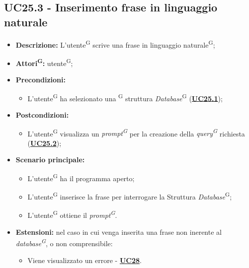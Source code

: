 \subsection{UC25.3 - Inserimento frase in linguaggio naturale}
\label{sec:UC25.3}
\begin{itemize}
	\item \textbf{Descrizione:} L’utente\textsuperscript{G} scrive una frase in linguaggio naturale\textsuperscript{G};
	\item \textbf{Attori\textsuperscript{G}:} utente\textsuperscript{G};
	\item \textbf{Precondizioni:} 
	\begin{itemize}
		\item L’utente\textsuperscript{G} ha selezionato una \textsuperscript{G} struttura \textit{Database}\textsuperscript{G} (\hyperref[sec:UC25.1]{\textbf{UC25.1}});
	\end{itemize}
	\item \textbf{Postcondizioni:} 
	\begin{itemize}
		\item L’utente\textsuperscript{G} visualizza un \textit{prompt\textsuperscript{G}} per la creazione della \textit{query\textsuperscript{G}} richiesta (\hyperref[sec:UC25.2]{\textbf{UC25.2}});
	\end{itemize}
	\item \textbf{Scenario principale:} 
	\begin{itemize}
		\item L’utente\textsuperscript{G} ha il programma aperto;
		\item L’utente\textsuperscript{G} inserisce la frase per interrogare la Struttura \textit{Database}\textsuperscript{G};
		\item L’utente\textsuperscript{G} ottiene il \textit{prompt\textsuperscript{G}}.
	\end{itemize}
	\item \textbf{Estensioni:} nel caso in cui venga inserita una frase non inerente al \textit{database\textsuperscript{G}}, o non comprensibile:
	\begin{itemize}
		\item Viene visualizzato un errore - \hyperref[sec:UC28]{\textbf{UC28}}.
	\end{itemize}
\end{itemize}

